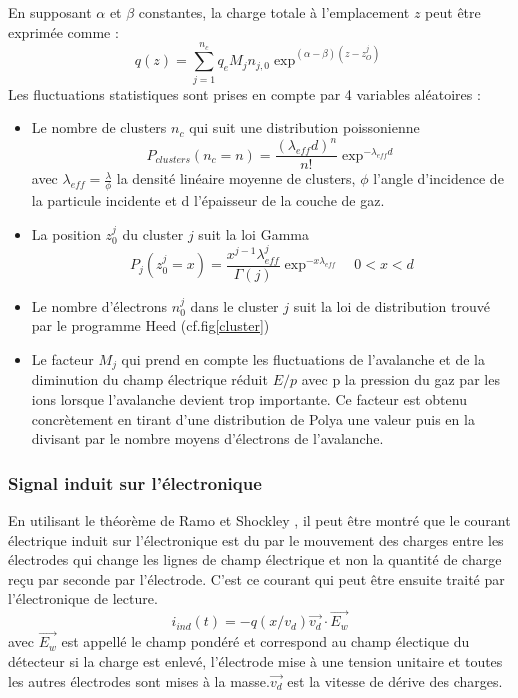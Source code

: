 En supposant $\alpha$ et $\beta$ constantes, la charge totale à l'emplacement $z$ peut être exprimée comme :
\begin{equation}
q(z)=\sum_{j=1}^{n_c}q_{e}M_{j}n_{j,0}\exp^{(\alpha-\beta)(z-z_O^j)}
\end{equation}
Les fluctuations statistiques sont prises en compte par 4 variables aléatoires :
\begin{itemize}[label=$\bullet$]
	\item Le nombre de clusters $n_c$ qui suit une distribution poissonienne 
	\begin{equation}
	P_{clusters}(n_c=n)=\frac{(\lambda_{eff}d)^{n}}{n!}\exp^{-\lambda_{eff}d}
	\end{equation}
	avec $\lambda_{eff}=\frac{\lambda}{\phi}$ la densité linéaire moyenne de clusters, $\phi$ l'angle d'incidence de la particule incidente et d l'épaisseur de la couche de gaz.
	\item La position $z_0^j$ du cluster $j$ suit la loi Gamma
	\begin{equation}
	P_{j}(z_0^j=x)=\frac{x^{j-1}\lambda_{eff}^{j}}{\Gamma(j)}\exp^{-x\lambda_{eff}} \quad 0<x<d
	\end{equation}
	\item Le nombre d'électrons $n_{0}^{j}$ dans le cluster $j$ suit la loi de distribution trouvé par le programme Heed (cf.fig\ref{cluster}) 
	\item Le facteur $M_{j}$ qui prend en compte les fluctuations de l'avalanche et de la diminution du champ électrique réduit $E/p$ avec p la pression du gaz par les ions lorsque l'avalanche devient trop importante. Ce facteur est obtenu concrètement en tirant d'une distribution de Polya une valeur puis en la divisant par le nombre moyens d'électrons de l'avalanche.
\end{itemize}

\subsubsection{Signal induit sur l'électronique}
En utilisant le théorème de Ramo et Shockley \cite{HE2001250}, il peut être montré que le courant électrique induit sur l'électronique est du  par le mouvement des charges entre les électrodes qui change les lignes de champ électrique et non la quantité de charge reçu par seconde par l'électrode. C'est ce courant qui peut être ensuite traité par l'électronique de lecture.
\begin{equation}
i_{ind}(t)=-q(x/v_{d})\vec{v_{d}}\cdot \vec{E_{w}}
\end{equation}
avec $\vec{E_{w}}$ est appellé le champ pondéré et correspond au champ électique du détecteur si la charge est enlevé, l'électrode mise à une tension unitaire  et toutes les autres électrodes sont mises à la masse.$\vec{v_{d}}$ est la vitesse de dérive des charges.

